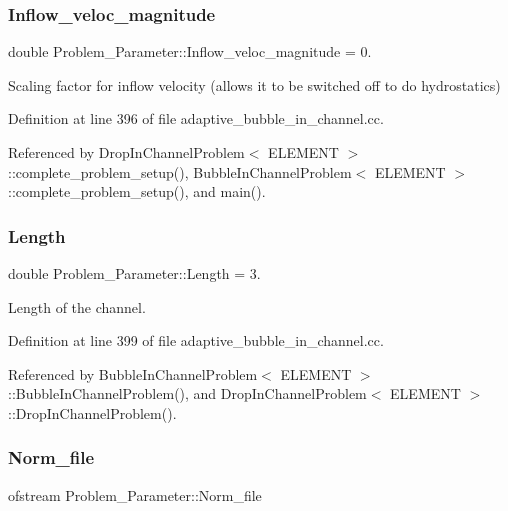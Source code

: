 \subsubsection{\texorpdfstring{Inflow\+\_\+veloc\+\_\+magnitude}{Inflow\_veloc\_magnitude}}
{\footnotesize\ttfamily double Problem\+\_\+\+Parameter\+::\+Inflow\+\_\+veloc\+\_\+magnitude = 0.}



Scaling factor for inflow velocity (allows it to be switched off to do hydrostatics) 



Definition at line 396 of file adaptive\+\_\+bubble\+\_\+in\+\_\+channel.\+cc.



Referenced by Drop\+In\+Channel\+Problem$<$ E\+L\+E\+M\+E\+N\+T $>$\+::complete\+\_\+problem\+\_\+setup(), Bubble\+In\+Channel\+Problem$<$ E\+L\+E\+M\+E\+N\+T $>$\+::complete\+\_\+problem\+\_\+setup(), and main().

\mbox{\label{namespaceProblem__Parameter_a7b67840fea463f29b53d12f7bd7cb34b}} 
\subsubsection{\texorpdfstring{Length}{Length}}
{\footnotesize\ttfamily double Problem\+\_\+\+Parameter\+::\+Length = 3.}



Length of the channel. 



Definition at line 399 of file adaptive\+\_\+bubble\+\_\+in\+\_\+channel.\+cc.



Referenced by Bubble\+In\+Channel\+Problem$<$ E\+L\+E\+M\+E\+N\+T $>$\+::\+Bubble\+In\+Channel\+Problem(), and Drop\+In\+Channel\+Problem$<$ E\+L\+E\+M\+E\+N\+T $>$\+::\+Drop\+In\+Channel\+Problem().

\mbox{\label{namespaceProblem__Parameter_a388e06a5e637b21378ab1832e5564bec}} 
\subsubsection{\texorpdfstring{Norm\+\_\+file}{Norm\_file}}
{\footnotesize\ttfamily ofstream Problem\+\_\+\+Parameter\+::\+Norm\+\_\+file}



